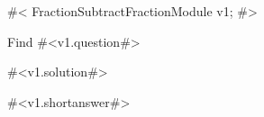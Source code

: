 

#<
FractionSubtractFractionModule v1;
#>

Find #<v1.question#>

#<v1.solution#>

#<v1.shortanswer#>


